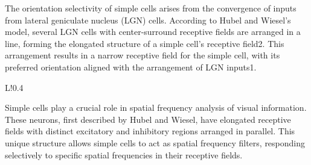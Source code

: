The orientation selectivity of simple cells arises from the convergence of inputs from lateral geniculate nucleus (LGN) cells. According to Hubel and Wiesel's model, several LGN cells with center-surround receptive fields are arranged in a line, forming the elongated structure of a simple cell's receptive field2. This arrangement results in a narrow receptive field for the simple cell, with its preferred orientation aligned with the arrangement of LGN inputs1.
\begin{wrapfigure}{L!}{0.4\textwidth}
\begin{tcolorbox}[every float=\centering, drop shadow, title=Simple Cells in V1 ,colback=white,colframe=WMgreen,
  colbacktitle=WMgreen,]

  \label{fig:SimpleCells}
 \end{tcolorbox}
\end{wrapfigure}

Simple cells play a crucial role in spatial frequency analysis of visual information. These neurons, first described by Hubel and Wiesel, have elongated receptive fields with distinct excitatory and inhibitory regions arranged in parallel. This unique structure allows simple cells to act as spatial frequency filters, responding selectively to specific spatial frequencies in their receptive fields. 

